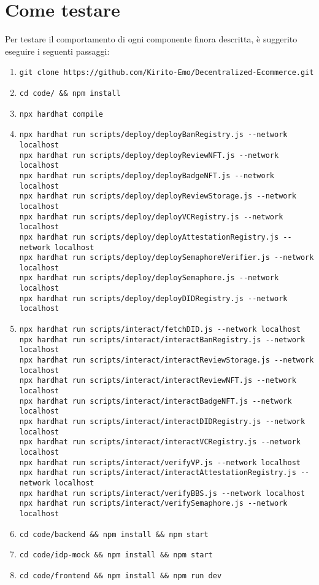     \section{Come testare}
        Per testare il comportamento di ogni componente finora descritta, è suggerito eseguire i seguenti passaggi:
            \begin{enumerate}
                \item \texttt{git clone https://github.com/Kirito-Emo/Decentralized-Ecommerce.git}

                \item \texttt{cd code/ \&\& npm install}

                \item \texttt{npx hardhat compile}

                \item
                    \begin{verbatim}
npx hardhat run scripts/deploy/deployBanRegistry.js --network localhost
npx hardhat run scripts/deploy/deployReviewNFT.js --network localhost
npx hardhat run scripts/deploy/deployBadgeNFT.js --network localhost
npx hardhat run scripts/deploy/deployReviewStorage.js --network localhost
npx hardhat run scripts/deploy/deployVCRegistry.js --network localhost
npx hardhat run scripts/deploy/deployAttestationRegistry.js --network localhost
npx hardhat run scripts/deploy/deploySemaphoreVerifier.js --network localhost
npx hardhat run scripts/deploy/deploySemaphore.js --network localhost
npx hardhat run scripts/deploy/deployDIDRegistry.js --network localhost
                    \end{verbatim}

                \item
                    \begin{verbatim}
npx hardhat run scripts/interact/fetchDID.js --network localhost
npx hardhat run scripts/interact/interactBanRegistry.js --network localhost
npx hardhat run scripts/interact/interactReviewStorage.js --network localhost
npx hardhat run scripts/interact/interactReviewNFT.js --network localhost
npx hardhat run scripts/interact/interactBadgeNFT.js --network localhost
npx hardhat run scripts/interact/interactDIDRegistry.js --network localhost
npx hardhat run scripts/interact/interactVCRegistry.js --network localhost
npx hardhat run scripts/interact/verifyVP.js --network localhost
npx hardhat run scripts/interact/interactAttestationRegistry.js --network localhost
npx hardhat run scripts/interact/verifyBBS.js --network localhost
npx hardhat run scripts/interact/verifySemaphore.js --network localhost
                    \end{verbatim}

                \item \texttt{cd code/backend \&\& npm install \&\& npm start}

                \item \texttt{cd code/idp-mock \&\& npm install \&\& npm start}

                \item \texttt{cd code/frontend \&\& npm install \&\& npm run dev}
            \end{enumerate}

